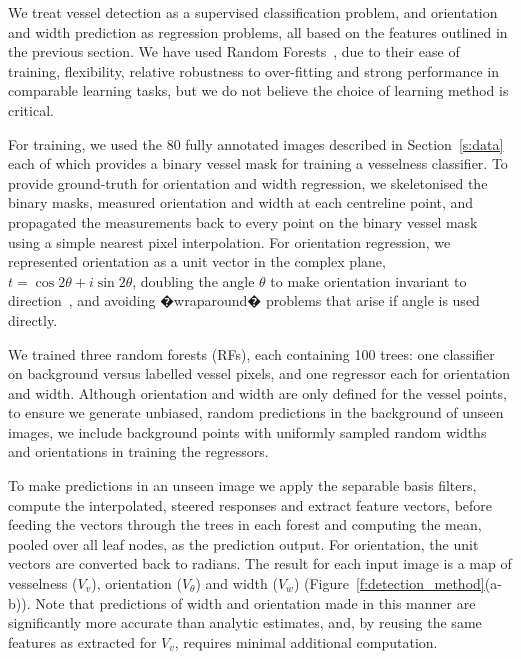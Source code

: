 \documentclass[runningheads,a4paper]{llncs}
\newcommand{\fref}[1]{Figure~\ref{#1}}
\newcommand{\sref}[1]{Section~\ref{#1}}
\def\ie{i.e.}
\begin{document}
We treat vessel detection as a supervised classification problem, and orientation and width prediction as regression problems, all based on the features outlined in the previous section. We have used Random Forests~\cite{Breiman_ML01}, due to their ease of training, flexibility, relative robustness to over-fitting and strong performance in comparable learning tasks, but we do not believe the choice of learning method is critical.

For training, we used the 80 fully annotated images described in \sref{s:data} each of which provides a binary vessel mask for training a vesselness classifier. To provide ground-truth for orientation and width regression, we skeletonised the binary masks, measured orientation and width at each centreline point, and propagated the measurements back to every point on the binary vessel mask using a simple nearest pixel interpolation. For orientation regression, we represented orientation as a unit vector in the complex plane, $t = \cos 2\theta + i\sin 2\theta$, doubling the angle $\theta$ to make orientation invariant to direction~\cite{Mardia_Jupp_00}, and avoiding �wraparound� problems that arise if angle is used directly.

We trained three random forests (RFs), each containing 100 trees: one classifier on background versus labelled vessel pixels, and one regressor each for orientation and width. Although orientation and width are only defined for the vessel points, to ensure we generate unbiased, random predictions in the background of unseen images, we include background points with uniformly sampled random widths and orientations in training the regressors.

To make predictions in an unseen image we apply the separable basis filters, compute the interpolated, steered responses and extract feature vectors, before feeding the vectors through the trees in each forest and computing the mean, pooled over all leaf nodes, as the prediction output. For orientation, the unit vectors are converted back to radians. The result for each input image is a map of vesselness ($V_v$), orientation ($V_\theta$) and width ($V_w$) (\fref{f:detection_method}(a-b)). Note that predictions of width and orientation made in this manner are significantly more accurate than analytic estimates, and, by reusing the same features as extracted for $V_v$, requires minimal additional computation.
\end{document}
